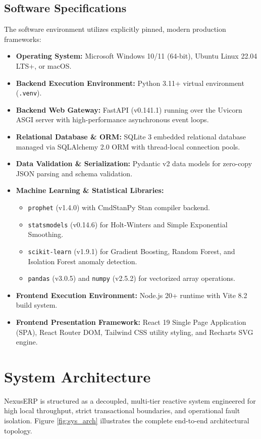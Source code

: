 \subsection{Software Specifications}
The software environment utilizes explicitly pinned, modern production frameworks:
\begin{itemize}
    \item \textbf{Operating System:} Microsoft Windows 10/11 (64-bit), Ubuntu Linux 22.04 LTS+, or macOS.
    \item \textbf{Backend Execution Environment:} Python 3.11+ virtual environment (\texttt{.venv}).
    \item \textbf{Backend Web Gateway:} FastAPI (v0.141.1) running over the Uvicorn ASGI server with high-performance asynchronous event loops.
    \item \textbf{Relational Database \& ORM:} SQLite 3 embedded relational database managed via SQLAlchemy 2.0 ORM with thread-local connection pools.
    \item \textbf{Data Validation \& Serialization:} Pydantic v2 data models for zero-copy JSON parsing and schema validation.
    \item \textbf{Machine Learning \& Statistical Libraries:}
    \begin{itemize}
        \item \texttt{prophet} (v1.4.0) with CmdStanPy Stan compiler backend.
        \item \texttt{statsmodels} (v0.14.6) for Holt-Winters and Simple Exponential Smoothing.
        \item \texttt{scikit-learn} (v1.9.1) for Gradient Boosting, Random Forest, and Isolation Forest anomaly detection.
        \item \texttt{pandas} (v3.0.5) and \texttt{numpy} (v2.5.2) for vectorized array operations.
    \end{itemize}
    \item \textbf{Frontend Execution Environment:} Node.js 20+ runtime with Vite 8.2 build system.
    \item \textbf{Frontend Presentation Framework:} React 19 Single Page Application (SPA), React Router DOM, Tailwind CSS utility styling, and Recharts SVG engine.
\end{itemize}

\section{System Architecture}
NexusERP is structured as a decoupled, multi-tier reactive system engineered for high local throughput, strict transactional boundaries, and operational fault isolation. Figure \ref{fig:sys_arch} illustrates the complete end-to-end architectural topology.

